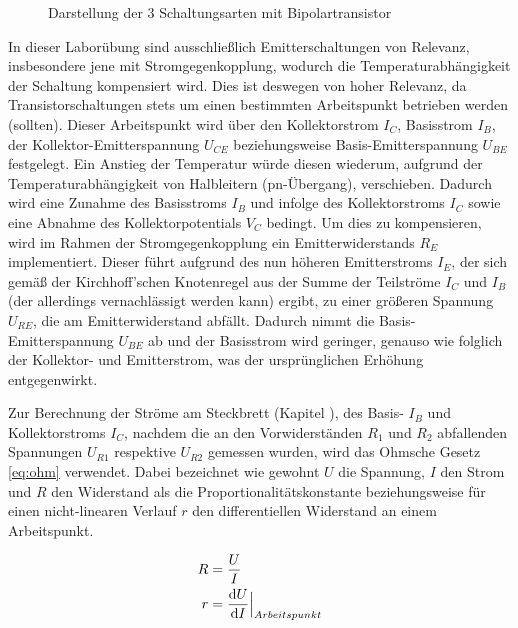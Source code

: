 \documentclass[12pt,english,ngerman]{scrartcl}
\begin{document}
\begin{figure}[H]
    \centering
    \caption{Darstellung der 3 Schaltungsarten mit Bipolartransistor \cite{tietze}}
    \label{fig:schaltungsarten}
\end{figure}

In dieser Laborübung sind ausschließlich Emitterschaltungen von Relevanz,
insbesondere jene mit Stromgegenkopplung, wodurch die Temperaturabhängigkeit
der Schaltung kompensiert wird. Dies ist deswegen von hoher Relevanz, da
Transistorschaltungen stets um einen bestimmten Arbeitspunkt betrieben werden
(sollten). Dieser Arbeitspunkt wird über den Kollektorstrom $I_C$, Basisstrom
$I_B$, der Kollektor-Emitterspannung $U_{CE}$ beziehungsweise
Basis-Emitterspannung $U_{BE}$ festgelegt. Ein Anstieg der Temperatur würde
diesen wiederum, aufgrund der Temperaturabhängigkeit von Halbleitern
(pn-Übergang), verschieben. Dadurch wird eine Zunahme des Basisstroms $I_B$ und
infolge des Kollektorstroms $I_C$ sowie eine Abnahme des Kollektorpotentials
$V_C$ bedingt. Um dies zu kompensieren, wird im Rahmen der Stromgegenkopplung
ein Emitterwiderstands $R_E$ implementiert. Dieser führt aufgrund des nun
höheren Emitterstroms $I_E$, der sich gemäß der Kirchhoff'schen Knotenregel aus
der Summe der Teilströme $I_C$ und $I_B$ (der allerdings vernachlässigt werden
kann) ergibt, zu einer größeren Spannung $U_{RE}$, die am Emitterwiderstand
abfällt. Dadurch nimmt die Basis-Emitterspannung $U_{BE}$ ab und der Basisstrom
wird geringer, genauso wie folglich der Kollektor- und Emitterstrom, was der
ursprünglichen Erhöhung entgegenwirkt. \cite{tietze}
\newline

Zur Berechnung der Ströme am Steckbrett (Kapitel ), des
Basis- $I_B$ und Kollektorstroms $I_C$, nachdem die an den Vorwiderständen
$R_1$ und $R_2$ abfallenden Spannungen $U_{R1}$ respektive $U_{R2}$ gemessen
wurden, wird das Ohmsche Gesetz \autoref{eq:ohm} verwendet. Dabei bezeichnet
wie gewohnt $U$ die Spannung, $I$ den Strom und $R$ den Widerstand als die
Proportionalitätskonstante beziehungsweise für einen nicht-linearen Verlauf $r$
den differentiellen Widerstand an einem Arbeitspunkt. \cite{tietze}

\begin{align}
	R&=\frac{U}{I} \label{eq:ohm}\\
	r&= \frac{\mathrm{d}U}{\mathrm{d}I} \Bigr|_{\substack{Arbeitspunkt}}
\end{align}
\end{document}
